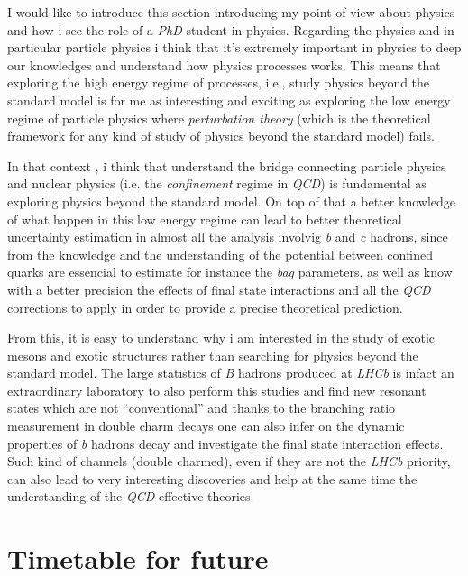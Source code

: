 \documentclass[paper=a4, fontsize=10pt]{scrartcl}
\numberwithin{equation}{section}		%
\numberwithin{figure}{section}			%
\numberwithin{table}{section}				%
\begin{document}
I would like to introduce this section introducing my point of view about physics and how i see the role of a \textit{PhD} student in physics. Regarding the physics and in particular particle physics i think that it's extremely important in physics to deep our knowledges and understand how physics processes works. This means that exploring the high energy regime of processes, i.e., study physics beyond the standard model is for me as interesting and exciting as exploring the low energy regime of particle physics where \textit{perturbation theory} (which is the theoretical framework for any kind of study of physics beyond the standard model) fails.

In that context , i think that understand the bridge connecting particle physics and nuclear physics (i.e. the \textit{confinement} regime in \textit{QCD}) is fundamental as exploring physics beyond the standard model.
On top of that a better knowledge of what happen in this low energy regime can lead to better theoretical uncertainty estimation in almost all the analysis involvig \textit{b} and \textit{c} hadrons, since from the knowledge and the understanding of the potential between confined quarks are essencial to estimate for instance the \textit{bag} parameters, as well as know with a better precision the effects of final state interactions and all the \textit{QCD} corrections to apply in order to provide a precise theoretical prediction. 

From this, it is easy to understand why i am interested in the study of exotic mesons and exotic structures rather than searching for physics beyond the standard model. The large statistics of \textit{B} hadrons produced at \textit{LHCb} is infact an extraordinary laboratory to also perform this studies and find new resonant states which are not ``conventional'' and thanks to the branching ratio measurement in double charm decays one can also infer on the dynamic properties of \textit{b} hadrons decay and investigate the final state interaction effects. Such kind of channels (double charmed), even if they are not the \textit{LHCb} priority, can also lead to very interesting discoveries and help at the same time the understanding of the \textit{QCD} effective theories.
\section{Timetable for future}
\end{document}
